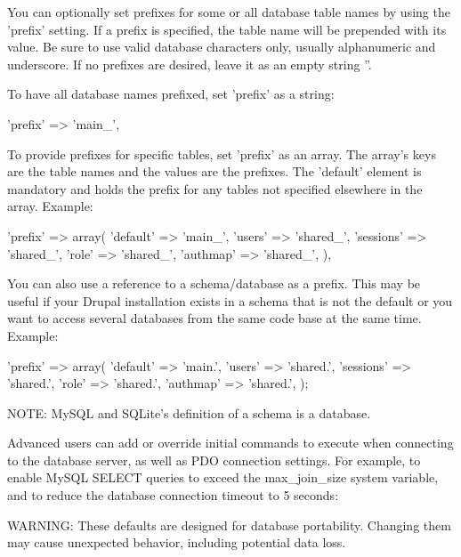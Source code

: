 You can optionally set prefixes for some or all database table names by using the 'prefix' setting. If a prefix is specified, the table name will be prepended with its value. Be sure to use valid database characters only, usually alphanumeric and underscore. If no prefixes are desired, leave it as an empty string ''.

To have all database names prefixed, set 'prefix' as a string: 
\begin{DoxyCode}
   'prefix' => 'main_',
\end{DoxyCode}
 To provide prefixes for specific tables, set 'prefix' as an array. The array's keys are the table names and the values are the prefixes. The 'default' element is mandatory and holds the prefix for any tables not specified elsewhere in the array. Example: 
\begin{DoxyCode}
   'prefix' => array(
     'default'   => 'main_',
     'users'     => 'shared_',
     'sessions'  => 'shared_',
     'role'      => 'shared_',
     'authmap'   => 'shared_',
   ),
\end{DoxyCode}
 You can also use a reference to a schema/database as a prefix. This may be useful if your Drupal installation exists in a schema that is not the default or you want to access several databases from the same code base at the same time. Example: 
\begin{DoxyCode}
   'prefix' => array(
     'default'   => 'main.',
     'users'     => 'shared.',
     'sessions'  => 'shared.',
     'role'      => 'shared.',
     'authmap'   => 'shared.',
   );
\end{DoxyCode}
 NOTE: MySQL and SQLite's definition of a schema is a database.

Advanced users can add or override initial commands to execute when connecting to the database server, as well as PDO connection settings. For example, to enable MySQL SELECT queries to exceed the max\_\-join\_\-size system variable, and to reduce the database connection timeout to 5 seconds:




WARNING: These defaults are designed for database portability. Changing them may cause unexpected behavior, including potential data loss.

